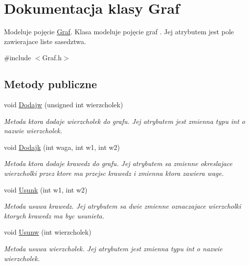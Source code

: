 \hypertarget{class_graf}{\section{Dokumentacja klasy Graf}
\label{class_graf}
}


Modeluje pojęcie \hyperlink{class_graf}{Graf}. Klasa modeluje pojęcie graf . Jej atrybutem jest pole zawierajace liste sasedztwa.  




{\ttfamily \#include $<$Graf.\-h$>$}

\subsection*{Metody publiczne}
\begin{DoxyCompactItemize}
\item 
void \hyperlink{class_graf_a924085191a51a6f0afbab7075f26eae3}{Dodajw} (unsigned int wierzcholek)
\begin{DoxyCompactList}\small\item\em Metoda ktora dodaje wierzcholek do grafu. Jej atrybutem jest zmienna typu int o nazwie wierzcholek. \end{DoxyCompactList}\item 
void \hyperlink{class_graf_a462c9d3d65e85fbee8e16bbeb7110803}{Dodajk} (int waga, int w1, int w2)
\begin{DoxyCompactList}\small\item\em Metoda ktora dodaje krawedz do grafu. Jej atrybutem sa zmienne okreslajace wierzcholki przez ktore ma przejsc krawedz i zmienna ktora zawiera wage. \end{DoxyCompactList}\item 
void \hyperlink{class_graf_a989e232821c5f0fa37d993168d56be6f}{Usunk} (int w1, int w2)
\begin{DoxyCompactList}\small\item\em Metoda usuwa krawedz. Jej atrybutem sa dwie zmienne oznaczajace wierzcholki ktorych krawedz ma byc usunieta. \end{DoxyCompactList}\item 
void \hyperlink{class_graf_a9c8c9ffa7ad533e0b5ab71d9addbaab5}{Usunw} (int wierzcholek)
\begin{DoxyCompactList}\small\item\em Metoda usuwa wierzcholek. Jej atrybutem jest zmienna typu int o nazwie wierzcholek. \end{DoxyCompactList}\item 

\end{DoxyCompactItemize}
